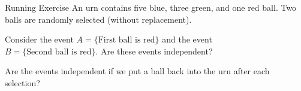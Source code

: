 \begin{vbframe}{Running Exercise}  
	An urn contains five blue, three green, and one red ball. Two balls are randomly selected (without replacement).
	
	\lz
	
	
	
	Consider the event $A=\{\mbox{First ball is red}\}$ and the event $B=\{\mbox{Second ball is red}\}.$ 
	Are these events independent?
	
	
	\lz
	
	\lz
	\lz
	\lz
	
	Are the events independent if we put a ball back into the urn after each selection?
	
	
	
\end{vbframe}


